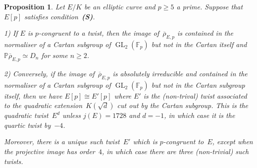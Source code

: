 \documentclass[12pt, reqno]{amsart}
\newcommand{\F}{\mathbb{F}}
\newcommand{\PP}{\mathbb{P}}
\newcommand{\rhobar}{{\overline{\rho}}}
\newcommand{\GL}{\operatorname{GL}}
\numberwithin{equation}{section}
\newtheorem{proposition}[theorem]{Proposition}
\theoremstyle{definition}
\theoremstyle{remark}
\newcommand{\condS}{condition~{\bf (S)}}
\begin{document}
\begin{comment}
When the projective image is~$D_n$ with $n\ge2$, it is often the case
that the image is contained in the normaliser~$N$ of a Cartan
subgroup~$C$ of~$\GL_2(\F_p)$.  For $n=2$, the projective image
is~$D_2\cong C_2\times C_2$, and there are there are three different
choices for~$C$ for which this holds, while for $n\ge3$ the Cartan
subgroup is unique.  The image may be dihedral in other ways, for
example $\left\{\begin{pmatrix}\pm1&*\\0&1\end{pmatrix}\right\}$, but
this is reducible so by the previous lemma does not give rise to a
congruent quadratic twist.
\end{comment}

\begin{proposition}\label{P:twist}
Let $E/K$ be an elliptic curve and $p \geq 5$ a prime. Suppose
that~$E[p]$ satisfies \condS.

1) If $E$ is $p$-congruent to a twist, 
then the image of~$\rhobar_{E,p}$ is contained in the normaliser of a
Cartan subgroup of $\GL_2(\F_p)$ but not in the Cartan itself and
$\PP \rhobar_{E,p} \simeq D_n$ for some $n \geq 2$.

2) Conversely, if the image of~$\rhobar_{E,p}$ is absolutely irreducible and contained in the
normaliser of a Cartan subgroup of $\GL_2(\F_p)$ but not in the Cartan
subgroup itself, 
then we have $E[p]\cong E'[p]$ where $E'$ is the (non-trival) twist associated to
the quadratic extension~$K(\sqrt{d})$ cut out by the Cartan subgroup.
This is the quadratic twist~$E^d$ unless $j(E)=1728$ and $d=-1$, in
which case it is the quartic twist by~$-4$.

Moreover, there is a unique such twist~$E'$ which is $p$-congruent to~$E$, except when the
projective image has order~$4$, in which case there are three (non-trivial) such
twists.
\end{proposition}
\end{document}
